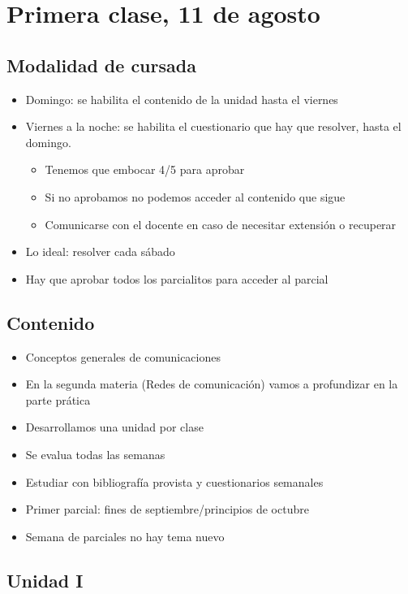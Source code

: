 \section{Primera clase, 11 de agosto}

\subsection{Modalidad de cursada}

\begin{itemize}
    \item Domingo: se habilita el contenido de la unidad hasta el viernes
    \item Viernes a la noche: se habilita el cuestionario que hay que resolver,
    hasta el domingo.
    \begin{itemize}
        \item Tenemos que embocar 4/5 para aprobar
        \item Si no aprobamos no podemos acceder al contenido que sigue
        \item Comunicarse con el docente en caso de necesitar extensión o recuperar
    \end{itemize}
    \item Lo ideal: resolver cada sábado
    \item Hay que aprobar todos los parcialitos para acceder al parcial 
\end{itemize}

\subsection{Contenido}

\begin{itemize}
    \item Conceptos generales de comunicaciones 
    \item En la segunda materia (Redes de comunicación) vamos a profundizar 
    en la parte prática
    \item Desarrollamos una unidad por clase 
    \item Se evalua todas las semanas 
    \item Estudiar con bibliografía provista y cuestionarios semanales 
    \item Primer parcial: fines de septiembre/principios de octubre
    \item Semana de parciales no hay tema nuevo
\end{itemize}

\subsection{Unidad I}

